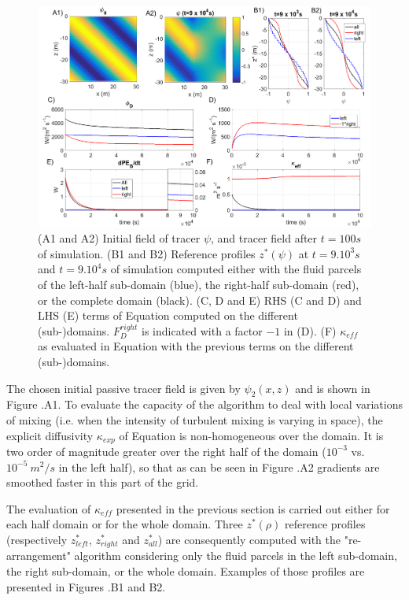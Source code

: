 \begin{figure}[h!]
\centering
\includegraphics[width=1\textwidth]{./CHAP_BPE/AGBPE_numlab2_2.png}
\caption[Initial field and evaluation of $\kappa_{eff}$ for configuration $BPE_{exp}$]{(A1 and A2) Initial field of tracer $\psi$, and tracer field after $t=100s$ of simulation. (B1 and B2) Reference profiles $z^*(\psi)$ at $t=9.10^3s$ and $t=9.10^4s$ of simulation computed either with the fluid parcels of the left-half sub-domain (blue), the right-half sub-domain (red), or the complete domain (black). (C, D and E) RHS (C and D) and LHS (E) terms of Equation  computed on the different (sub-)domains. $F_D^{right}$ is indicated with a factor $-1$ in (D). (F) $\kappa_{eff}$ as evaluated in Equation  with the previous terms on the different (sub-)domains.}
\label{fig2numlab}
\end{figure}

The chosen initial passive tracer field is given by $\psi_2 (x,z)$ and is shown in Figure .A1.
To evaluate the capacity of the algorithm to deal with local variations of mixing (i.e. when the intensity of turbulent mixing is varying in space), the explicit diffusivity $\kappa_{exp}$ of Equation  is non-homogeneous over the domain. It is two order of magnitude greater over the right half of the domain ($10^{-3}$ vs. $10^{-5} \ m^2/s$ in the left half), so that as can be seen in Figure .A2 gradients are smoothed faster in this part of the grid.

The evaluation of $\kappa_{eff}$ presented in the previous section is carried out either for each half domain or for the whole domain. Three $z^*(\rho)$ reference profiles (respectively $z^*_{left}$, $z^*_{right}$ and $z^*_{all}$) are consequently computed with the "re-arrangement" algorithm considering only the fluid parcels in the left sub-domain, the right sub-domain, or the whole domain. Examples of those profiles are presented in Figures .B1 and B2.

